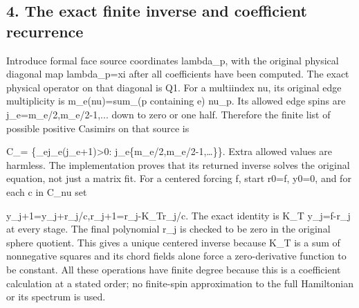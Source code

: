 \documentclass[11pt,a4paper]{article}
\renewcommand{\[}{\begingroup\small\originaldisplaystart}
\renewcommand{\]}{\originaldisplayend\endgroup}
\begin{document}
\subsection{4. The exact finite inverse and coefficient
recurrence}\label{the-exact-finite-inverse-and-coefficient-recurrence}

Introduce formal face source coordinates
{\ttfamily l\allowbreak{}a\allowbreak{}m\allowbreak{}b\allowbreak{}d\allowbreak{}a\allowbreak{}\_\allowbreak{}p\allowbreak{}},
with the original physical diagonal map
{\ttfamily l\allowbreak{}a\allowbreak{}m\allowbreak{}b\allowbreak{}d\allowbreak{}a\allowbreak{}\_\allowbreak{}p\allowbreak{}=\allowbreak{}x\allowbreak{}i\allowbreak{}}
after all coefficients have been computed. The exact physical operator
on that diagonal is Q1. For a multiindex nu, its original edge
multiplicity is
{\ttfamily m\allowbreak{}\_\allowbreak{}e\allowbreak{}(\allowbreak{}n\allowbreak{}u\allowbreak{})\allowbreak{}=\allowbreak{}s\allowbreak{}u\allowbreak{}m\allowbreak{}\_\allowbreak{}(\allowbreak{}p\allowbreak{} \allowbreak{}c\allowbreak{}o\allowbreak{}n\allowbreak{}t\allowbreak{}a\allowbreak{}i\allowbreak{}n\allowbreak{}i\allowbreak{}n\allowbreak{}g\allowbreak{} \allowbreak{}e\allowbreak{})\allowbreak{} \allowbreak{}n\allowbreak{}u\allowbreak{}\_\allowbreak{}p\allowbreak{}}.
Its allowed edge spins are
{\ttfamily j\allowbreak{}\_\allowbreak{}e\allowbreak{}=\allowbreak{}m\allowbreak{}\_\allowbreak{}e\allowbreak{}/\allowbreak{}2\allowbreak{},\allowbreak{}m\allowbreak{}\_\allowbreak{}e\allowbreak{}/\allowbreak{}2\allowbreak{}-\allowbreak{}1\allowbreak{},\allowbreak{}.\allowbreak{}.\allowbreak{}.\allowbreak{}}
down to zero or one half. Therefore the finite list of possible positive
Casimirs on that source is

\[
 \mathcal C_\nu=
 \left\{\sum_ej_e(j_e+1)>0:
 j_e\in\{m_e/2,m_e/2-1,\ldots\}\right\}.
\] Extra allowed values are harmless. The implementation proves that its
returned inverse solves the original equation, not just a matrix fit.
For a centered forcing f, start
{\ttfamily r\allowbreak{}0\allowbreak{}=\allowbreak{}f\allowbreak{}},
{\ttfamily y\allowbreak{}0\allowbreak{}=\allowbreak{}0\allowbreak{}},
and for each
{\ttfamily c\allowbreak{} \allowbreak{}i\allowbreak{}n\allowbreak{} \allowbreak{}C\allowbreak{}\_\allowbreak{}n\allowbreak{}u\allowbreak{}}
set

\[
 y_{j+1}=y_j+r_j/c,\qquad r_{j+1}=r_j-K_Tr_j/c.
\] The exact identity is
{\ttfamily K\allowbreak{}\_\allowbreak{}T\allowbreak{} \allowbreak{}y\allowbreak{}\_\allowbreak{}j\allowbreak{}=\allowbreak{}f\allowbreak{}-\allowbreak{}r\allowbreak{}\_\allowbreak{}j\allowbreak{}}
at every stage. The final polynomial
{\ttfamily r\allowbreak{}\_\allowbreak{}j\allowbreak{}} is checked to be
zero in the original sphere quotient. This gives a unique centered
inverse because K\_T is a sum of nonnegative squares and its chord
fields alone force a zero-derivative function to be constant. All these
operations have finite degree because this is a coefficient calculation
at a stated order; no finite-spin approximation to the full Hamiltonian
or its spectrum is used.
\end{document}
